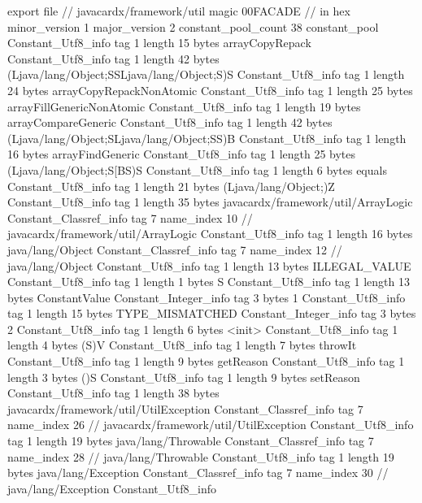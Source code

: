 export file {		// javacardx/framework/util
	magic	00FACADE		 // in hex
	minor_version	1
	major_version	2
	constant_pool_count	38
	constant_pool {
		Constant_Utf8_info {
			tag	1
			length	15
			bytes	arrayCopyRepack
		}
		Constant_Utf8_info {
			tag	1
			length	42
			bytes	(Ljava/lang/Object;SSLjava/lang/Object;S)S
		}
		Constant_Utf8_info {
			tag	1
			length	24
			bytes	arrayCopyRepackNonAtomic
		}
		Constant_Utf8_info {
			tag	1
			length	25
			bytes	arrayFillGenericNonAtomic
		}
		Constant_Utf8_info {
			tag	1
			length	19
			bytes	arrayCompareGeneric
		}
		Constant_Utf8_info {
			tag	1
			length	42
			bytes	(Ljava/lang/Object;SLjava/lang/Object;SS)B
		}
		Constant_Utf8_info {
			tag	1
			length	16
			bytes	arrayFindGeneric
		}
		Constant_Utf8_info {
			tag	1
			length	25
			bytes	(Ljava/lang/Object;S[BS)S
		}
		Constant_Utf8_info {
			tag	1
			length	6
			bytes	equals
		}
		Constant_Utf8_info {
			tag	1
			length	21
			bytes	(Ljava/lang/Object;)Z
		}
		Constant_Utf8_info {
			tag	1
			length	35
			bytes	javacardx/framework/util/ArrayLogic
		}
		Constant_Classref_info {
			tag	7
			name_index	10		// javacardx/framework/util/ArrayLogic
		}
		Constant_Utf8_info {
			tag	1
			length	16
			bytes	java/lang/Object
		}
		Constant_Classref_info {
			tag	7
			name_index	12		// java/lang/Object
		}
		Constant_Utf8_info {
			tag	1
			length	13
			bytes	ILLEGAL_VALUE
		}
		Constant_Utf8_info {
			tag	1
			length	1
			bytes	S
		}
		Constant_Utf8_info {
			tag	1
			length	13
			bytes	ConstantValue
		}
		Constant_Integer_info {
			tag	3
			bytes	1
		}
		Constant_Utf8_info {
			tag	1
			length	15
			bytes	TYPE_MISMATCHED
		}
		Constant_Integer_info {
			tag	3
			bytes	2
		}
		Constant_Utf8_info {
			tag	1
			length	6
			bytes	<init>
		}
		Constant_Utf8_info {
			tag	1
			length	4
			bytes	(S)V
		}
		Constant_Utf8_info {
			tag	1
			length	7
			bytes	throwIt
		}
		Constant_Utf8_info {
			tag	1
			length	9
			bytes	getReason
		}
		Constant_Utf8_info {
			tag	1
			length	3
			bytes	()S
		}
		Constant_Utf8_info {
			tag	1
			length	9
			bytes	setReason
		}
		Constant_Utf8_info {
			tag	1
			length	38
			bytes	javacardx/framework/util/UtilException
		}
		Constant_Classref_info {
			tag	7
			name_index	26		// javacardx/framework/util/UtilException
		}
		Constant_Utf8_info {
			tag	1
			length	19
			bytes	java/lang/Throwable
		}
		Constant_Classref_info {
			tag	7
			name_index	28		// java/lang/Throwable
		}
		Constant_Utf8_info {
			tag	1
			length	19
			bytes	java/lang/Exception
		}
		Constant_Classref_info {
			tag	7
			name_index	30		// java/lang/Exception
		}
		Constant_Utf8_info {
}}}

